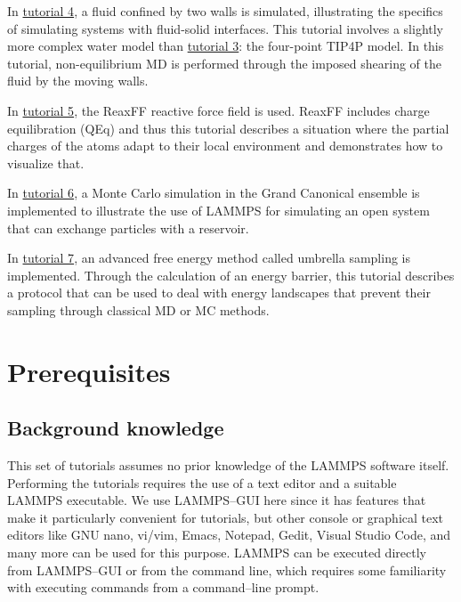 \documentclass[9pt,tutorial]{livecoms}
\begin{document}
In \hyperref[sheared-confined-label]{tutorial 4}, a fluid confined by
two walls is simulated, illustrating the specifics of simulating systems
with fluid-solid interfaces.  This tutorial involves a slightly more
complex water model than \hyperref[all-atoms-label]{tutorial 3}: the
four-point TIP4P model.  In this tutorial, non-equilibrium MD is
performed through the imposed shearing of the fluid by the moving walls.

In \hyperref[reactive-silicon-dioxide-label]{tutorial 5}, the ReaxFF
reactive force field is used.  ReaxFF includes charge equilibration
(QEq) and thus this tutorial describes a situation where the partial
charges of the atoms adapt to their local environment and demonstrates
how to visualize that.

In \hyperref[gcmc-silica-label]{tutorial 6}, a Monte Carlo simulation in
the Grand Canonical ensemble is implemented to illustrate the use of
LAMMPS for simulating an open system that can exchange particles with a
reservoir.

In \hyperref[umbrella-sampling-label]{tutorial 7}, an advanced free
energy method called umbrella sampling is implemented.  Through the
calculation of an energy barrier, this tutorial describes a protocol
that can be used to deal with energy landscapes that prevent their
sampling through classical MD or MC methods.


\section{Prerequisites}


\subsection{Background knowledge}

This set of tutorials assumes no prior knowledge of the LAMMPS software
itself.  Performing the tutorials requires the use of a text editor and
a suitable LAMMPS executable.  We use LAMMPS--GUI \cite{lammps_gui_docs}
here since it has features that make it particularly convenient for
tutorials, but other console or graphical text editors like GNU nano,
vi/vim, Emacs, Notepad, Gedit, Visual Studio Code, and many more can be
used for this purpose.  LAMMPS can be executed directly from LAMMPS--GUI
or from the command line, which requires some familiarity with executing
commands from a command--line prompt.
\end{document}
